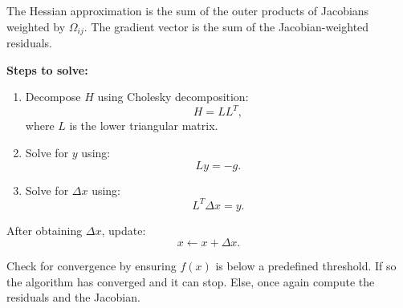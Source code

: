 \documentclass{article}
\begin{document}
\begin{enumerate}
    The Hessian approximation is the sum of the outer products of Jacobians weighted by $\Omega_{ij}$. The gradient vector is the sum of the Jacobian-weighted residuals.

    \textbf{Steps to solve:}
    \begin{enumerate}
        \item Decompose $H$ using Cholesky decomposition:
        \[
        H = L L^T,
        \]
        where $L$ is the lower triangular matrix.
        \item Solve for $y$ using:
        \[
        L y = -g.
        \]
        \item Solve for $\Delta x$ using:
        \[
        L^T \Delta x = y.
        \]
    \end{enumerate}

    After obtaining $\Delta x$, update:
    \[
    x \leftarrow x + \Delta x.
    \]

    Check for convergence by ensuring $f(x)$ is below a predefined threshold. If so the algorithm has converged and it can stop.
    Else, once again compute the residuals and the Jacobian.
\end{enumerate}
\end{document}
